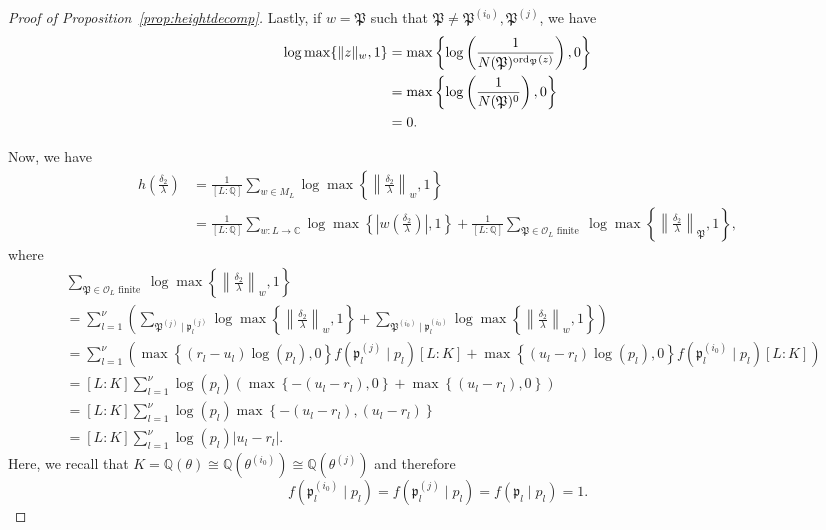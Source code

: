 \begin{proof}[Proof of Proposition~\ref{prop:heightdecomp}]
Lastly, if $w = \mathfrak{P}$ such that $\mathfrak{P} \neq \mathfrak{P}^{(i_0)},  \mathfrak{P}^{(j)}$, we have
\begin{align*}
 \log \max \{ \|z\|_{w}, 1\}	
 	& = \max \left\{ \log\left(\frac{1}{N(\mathfrak{P})^{\operatorname{ord}_{\mathfrak{P}}(z)}} \right), 0\right\}\\
	& = \max \left\{ \log\left(\frac{1}{N(\mathfrak{P})^{0}} \right), 0\right\}\\
	& = 0.
\end{align*}

Now, we have 
\begin{align*}
h\left(\frac{\delta_2}{\lambda}\right)
	& =\frac{1}{[L:\mathbb{Q}]}\sum_{w \in M_L} \log \max \left\{ \left\|\frac{\delta_2}{\lambda}\right\|_{w}, 1\right\}\\
	& = \frac{1}{[L:\mathbb{Q}]}\sum_{w :L \to \mathbb{C}} \log \max \left\{ \left|w\left(\frac{\delta_2}{\lambda}\right)\right|, 1\right\} + \frac{1}{[L:\mathbb{Q}]}\sum_{\mathfrak{P} \in \mathcal{O}_L \text{ finite }} \log \max \left\{ \left\|\frac{\delta_2}{\lambda}\right\|_{\mathfrak{P}}, 1\right\},
\end{align*}
where
\begin{align*}
& \sum_{\mathfrak{P} \in \mathcal{O}_L \text{ finite }} \log \max \left\{ \left\|\frac{\delta_2}{\lambda}\right\|_{w}, 1\right\} \\
	& = \sum_{l = 1}^{\nu} \left(\sum_{\mathfrak{P}^{(j)} \mid \mathfrak{p}_l^{(j)}} \log \max \left\{ \left\|\frac{\delta_2}{\lambda}\right\|_{w}, 1\right\} + \sum_{\mathfrak{P}^{(i_0)} \mid \mathfrak{p}_l^{(i_0)}} \log \max \left\{ \left\|\frac{\delta_2}{\lambda}\right\|_{w}, 1\right\}\right)\\
	& = \sum_{l = 1}^{\nu} \left(\max \left\{ (r_l - u_l)\log(p_l), 0\right\}f(\mathfrak{p}_l^{(j)}\mid p_l)[L:K] + \max \left\{ (u_l - r_l)\log(p_l), 0\right\}f(\mathfrak{p}_l^{(i_0)}\mid p_l)[L:K]\right)\\
	& =  [L:K]\sum_{l = 1}^{\nu} \log(p_l)\left(\max \left\{ -(u_l - r_l), 0\right\}+ \max \left\{ (u_l - r_l), 0\right\}\right)\\
	& =  [L:K]\sum_{l = 1}^{\nu} \log(p_l)\max \left\{ -(u_l - r_l), (u_l - r_l)\right\}\\
	& =  [L:K]\sum_{l = 1}^{\nu} \log(p_l)|u_l - r_l|.
\end{align*}
Here, we recall that $K = \mathbb{Q}(\theta) \cong \mathbb{Q}(\theta^{(i_0)}) \cong \mathbb{Q}(\theta^{(j)})$ and therefore 
\[f(\mathfrak{p}_l^{(i_0)}\mid p_l) = f(\mathfrak{p}_l^{(j)}\mid p_l) = f(\mathfrak{p}_l\mid p_l) = 1.\]

\end{proof}
